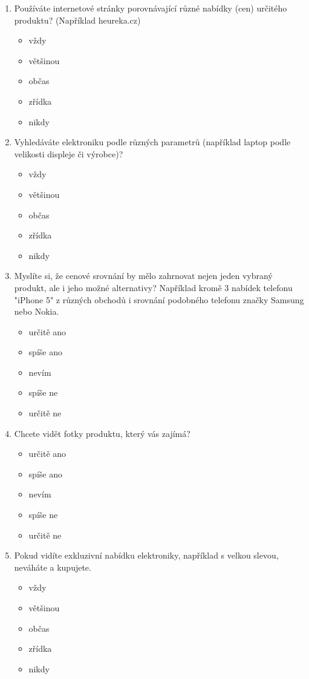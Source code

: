 \documentclass[12pt,twoside,openany]{fithesis}
\begin{document}
\begin{enumerate}
  
\item Používáte internetové stránky porovnávající různé nabídky (cen) určitého produktu? (Například heureka.cz) 
    \begin{itemize}
       \item vždy
       \item většinou
       \item občas
       \item zřídka
       \item nikdy
    \end{itemize}

\item Vyhledáváte elektroniku podle různých parametrů (například laptop podle velikosti displeje či výrobce)? 
    \begin{itemize}
       \item vždy
       \item většinou
       \item občas
       \item zřídka
       \item nikdy
    \end{itemize}

  \item Myslíte si, že cenové srovnání by mělo zahrnovat nejen jeden vybraný produkt, ale i jeho možné alternativy? 
      Například kromě 3 nabídek telefonu "iPhone 5" z různých obchodů i srovnání podobného telefonu značky Samsung nebo Nokia.
    \begin{itemize}
       \item určitě ano
       \item spíše ano
       \item nevím
       \item spíše ne
       \item určitě ne
    \end{itemize}

  \item Chcete vidět fotky produktu, který vás zajímá?
    \begin{itemize}
       \item určitě ano
       \item spíše ano
       \item nevím
       \item spíše ne
       \item určitě ne
    \end{itemize}

  \item Pokud vidíte exkluzivní nabídku elektroniky, například s velkou slevou, neváháte a kupujete.
    \begin{itemize}
       \item vždy
       \item většinou
       \item občas
       \item zřídka
       \item nikdy
    \end{itemize}


\end{enumerate}
\end{document}
